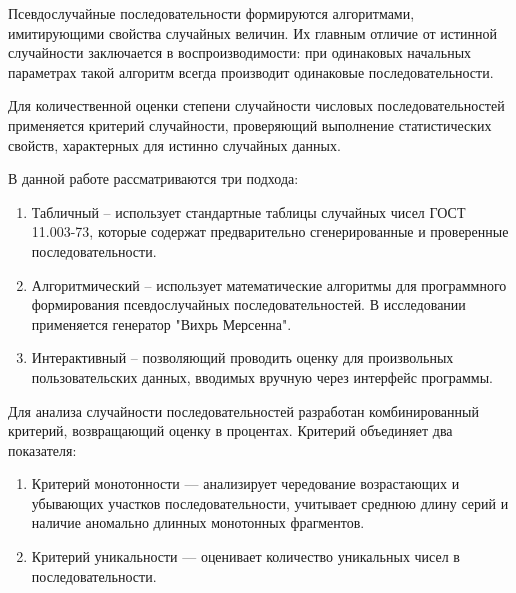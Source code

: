 %
%


Псевдослучайные последовательности формируются алгоритмами, имитирующими свойства случайных величин. Их главным отличие от истинной случайности заключается в воспроизводимости: при одинаковых начальных параметрах такой алгоритм всегда производит одинаковые последовательности. 

Для количественной оценки степени случайности числовых последовательностей применяется критерий случайности, проверяющий выполнение статистических свойств, характерных для истинно случайных данных.


В данной работе рассматриваются три подхода:

\begin{enumerate}[label={\arabic*)}]
	\item Табличный -- использует стандартные таблицы случайных чисел ГОСТ 11.003-73, которые содержат предварительно сгенерированные и проверенные последовательности.
	\item Алгоритмический -- использует математические алгоритмы для программного формирования псевдослучайных последовательностей. В исследовании применяется генератор "Вихрь Мерсенна".
	\item Интерактивный -- позволяющий проводить оценку для произвольных пользовательских данных, вводимых вручную через интерфейс программы.
\end{enumerate}

{}

Для анализа случайности последовательностей разработан комбинированный критерий, возвращающий оценку в процентах. Критерий объединяет два показателя:

\begin{enumerate}[label={\arabic*)}]
	\item Критерий монотонности — анализирует чередование возрастающих и убывающих участков последовательности, учитывает среднюю длину серий и наличие аномально длинных монотонных фрагментов.
	\item Критерий уникальности — оценивает количество уникальных чисел в последовательности.
\end{enumerate}

